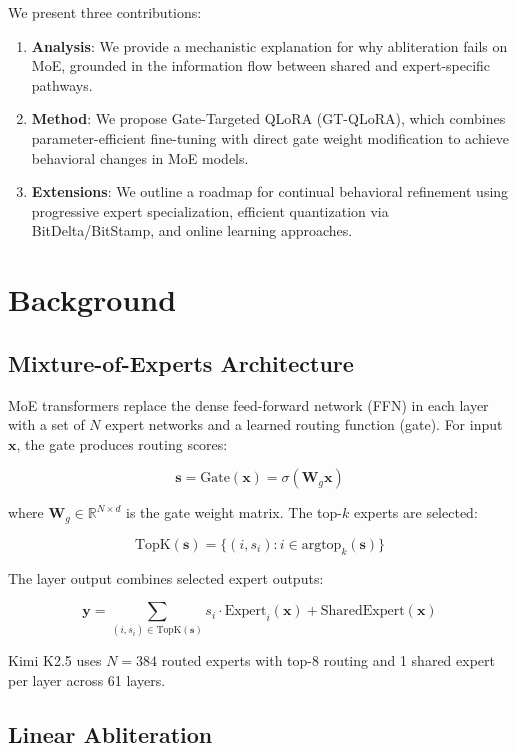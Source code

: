 \documentclass[11pt,a4paper]{article}
\begin{document}
We present three contributions:
\begin{enumerate}
    \item \textbf{Analysis}: We provide a mechanistic explanation for why abliteration fails on MoE, grounded in the information flow between shared and expert-specific pathways.
    \item \textbf{Method}: We propose Gate-Targeted QLoRA (GT-QLoRA), which combines parameter-efficient fine-tuning with direct gate weight modification to achieve behavioral changes in MoE models.
    \item \textbf{Extensions}: We outline a roadmap for continual behavioral refinement using progressive expert specialization, efficient quantization via BitDelta/BitStamp, and online learning approaches.
\end{enumerate}

\section{Background}

\subsection{Mixture-of-Experts Architecture}

MoE transformers replace the dense feed-forward network (FFN) in each layer with a set of $N$ expert networks and a learned routing function (gate). For input $\mathbf{x}$, the gate produces routing scores:

$$\mathbf{s} = \text{Gate}(\mathbf{x}) = \sigma(\mathbf{W}_g \mathbf{x})$$

where $\mathbf{W}_g \in \mathbb{R}^{N \times d}$ is the gate weight matrix. The top-$k$ experts are selected:

$$\text{TopK}(\mathbf{s}) = \{(i, s_i) : i \in \text{argtop}_k(\mathbf{s})\}$$

The layer output combines selected expert outputs:

$$\mathbf{y} = \sum_{(i, s_i) \in \text{TopK}(\mathbf{s})} s_i \cdot \text{Expert}_i(\mathbf{x}) + \text{SharedExpert}(\mathbf{x})$$

Kimi K2.5 uses $N=384$ routed experts with top-8 routing and 1 shared expert per layer across 61 layers.

\subsection{Linear Abliteration}
\end{document}
